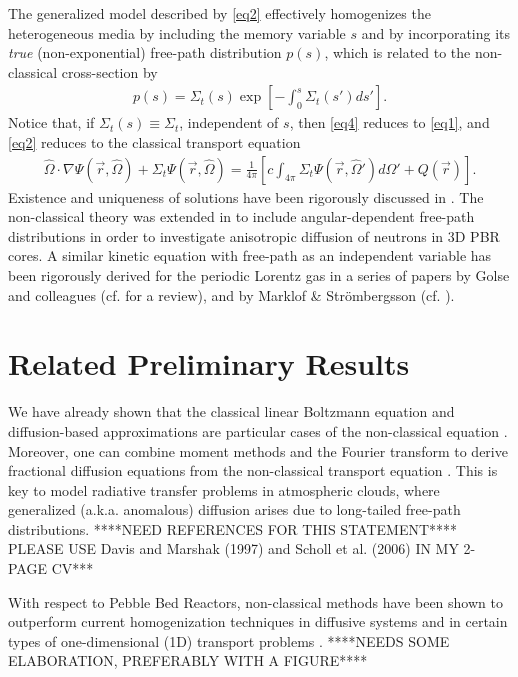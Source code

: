\documentclass[12pt]{article}
\newcommand{\rvec}{\ensuremath{\vec{r}}}
\newcommand{\omvec}{\ensuremath{\hat{\Omega}}}
\begin{document}
The generalized model described by \cref{eq2} effectively homogenizes the heterogeneous media by including the memory variable $s$ and by incorporating its \textit{true} (non-exponential) free-path distribution $p(s)$, which is related to the non-classical cross-section by \cite{larvas11}
\begin{align}\label{eq4}
p(s) = \Sigma_t(s)\exp\left[-\int_0^s\Sigma_t(s')ds'\right].
\end{align}
Notice that, if $\Sigma_t(s)\equiv\Sigma_t$, independent of $s$, then \cref{eq4} reduces to \cref{eq1}, and \cref{eq2} reduces to the classical transport equation
\begin{align}\label{eq5}
\omvec\cdot\nabla\Psi(\rvec,\omvec) + \Sigma_t\Psi(\rvec,\omvec)
= \frac{1}{4\pi}\left[c\int_{4\pi} \Sigma_t\Psi(\rvec,\omvec')d\Omega' + Q(\rvec)\right].\nonumber
\end{align}
Existence and uniqueness of solutions have been rigorously discussed in \cite{fragou10}.
The non-classical theory was extended in \cite{vaslar14a} to include angular-dependent free-path distributions in order to investigate anisotropic diffusion of neutrons in 3D PBR cores.
A similar kinetic equation with free-path as an independent variable has been rigorously derived for the periodic Lorentz gas in a series of papers by Golse and colleagues (cf. \cite{gol12} for a review), and by Marklof \& Str\"ombergsson (cf. \cite{marstr11,marstr15}).

\section{Related Preliminary Results}

We have already shown that the classical linear Boltzmann equation and diffusion-based approximations are particular cases of the non-classical equation \cite{frakry15,vas16}.
Moreover, one can combine moment methods and the Fourier transform to derive fractional diffusion equations from the non-classical transport equation \cite{frasun16}.
This is key to model radiative transfer problems in atmospheric clouds, where generalized (a.k.a. anomalous) diffusion arises due to long-tailed free-path distributions.
****NEED REFERENCES FOR THIS STATEMENT****
PLEASE USE Davis and Marshak (1997) and Scholl et al. (2006) IN MY 2-PAGE CV***

With respect to Pebble Bed Reactors, non-classical methods have been shown to outperform current homogenization techniques in diffusive systems \cite{larvas11,vaslar14b,vas13} and in certain types of one-dimensional (1D) transport problems \cite{vaskry16}.
****NEEDS SOME ELABORATION, PREFERABLY WITH A FIGURE****
\end{document}
